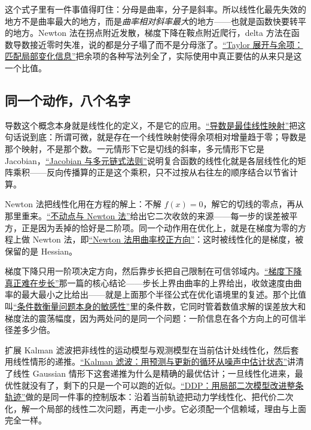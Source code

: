 这个式子里有一件事值得盯住：分母是曲率，分子是斜率。所以线性化最先失效的地方不是曲率最大的地方，而是\emph{曲率相对斜率最大}的地方——也就是函数快要转平的地方。Newton 法在拐点附近发散，梯度下降在鞍点附近爬行，delta 方法在函数导数接近零时失准，说的都是分子塌了而不是分母涨了。\hyperref[sec:02-Calculus/05-Sequences-and-Series/06]{``Taylor 展开与余项：匹配局部变化信息''}把余项的各种写法列全了，实际使用中真正要估的从来只是这一个比值。

\subsection{同一个动作，八个名字}

导数这个概念本身就是线性化的定义，不是它的应用。\hyperref[sec:10-Matrix-Calculus/01-Derivative-Conventions/01]{``导数是最佳线性映射''}把这句话说到底：所谓可微，就是存在一个线性映射使得余项相对增量趋于零；导数是那个映射，不是那个数。一元情形下它是切线的斜率，多元情形下它是 Jacobian，\hyperref[sec:02-Calculus/06-Multivariable-Calculus/04]{``Jacobian 与多元链式法则''}说明复合函数的线性化就是各层线性化的矩阵乘积——反向传播算的正是这个乘积，只不过按从右往左的顺序结合以节省计算。

Newton 法把线性化用在方程的解上：不解 \(f(x)=0\)，解它的切线的零点，再从那里重来。\hyperref[sec:08-Numerical-Analysis/02-Root-Finding/02]{``不动点与 Newton 法''}给出它二次收敛的来源——每一步的误差被平方，正是因为丢掉的恰好是二阶项。同一个动作用在优化上，就是在梯度为零的方程上做 Newton 法，即\hyperref[sec:09-Convex-Optimization/06-Optimization-Algorithms/02]{``Newton 法用曲率校正方向''}：这时被线性化的是梯度，被保留的是 Hessian。

梯度下降只用一阶项决定方向，然后靠步长把自己限制在可信邻域内。\hyperref[sec:09-Convex-Optimization/06-Optimization-Algorithms/01]{``梯度下降真正难在步长''}那一篇的核心结论——步长上界由曲率的上界给出，收敛速度由曲率的最大最小之比给出——就是上面那个半径公式在优化语境里的复述。那个比值叫\hyperref[sec:08-Numerical-Analysis/01-Floating-Point-and-Error/03]{``条件数衡量问题本身的敏感性''}里的条件数，它同时管着数值求解的误差放大和梯度法的震荡幅度，因为两处问的是同一个问题：一阶信息在各个方向上的可信半径差多少倍。

扩展 Kalman 滤波把非线性的运动模型与观测模型在当前估计处线性化，然后套用线性情形的递推。\hyperref[sec:16-Control-and-Reinforcement-Learning/01-Optimal-Control/04]{``Kalman 滤波：用预测与更新的循环从噪声中估计状态''}讲清了线性 Gaussian 情形下这套递推为什么是精确的最优估计；一旦线性化进来，最优性就没有了，剩下的只是一个可以跑的近似。\hyperref[sec:16-Control-and-Reinforcement-Learning/01-Optimal-Control/06]{``DDP：用局部二次模型改进整条轨迹''}做的是同一件事的控制版本：沿着当前轨迹把动力学线性化、把代价二次化，解一个局部的线性二次问题，再走一小步。它必须配一个信赖域，理由与上面完全一样。

